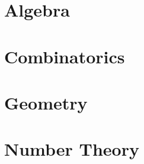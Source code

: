 \documentclass[letterpaper]{article}
\begin{document}
\section{Algebra}

\section{Combinatorics}

\section{Geometry}

\section{Number Theory}

\end{document}
